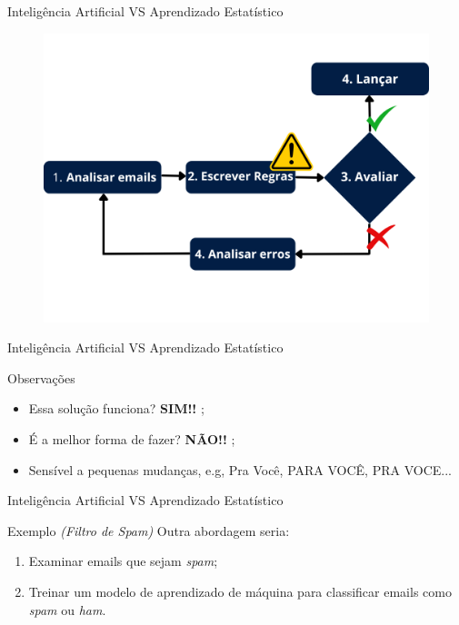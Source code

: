 \begin{frame}{Inteligência Artificial VS Aprendizado Estatístico}
	\begin{figure}[h]
		\includegraphics[scale=0.4]{imagens//secao1/tradicionalspam.png}
	\end{figure}
\end{frame}


\begin{frame}{Inteligência Artificial VS Aprendizado Estatístico}
	\begin{block}{Observações}
		\begin{itemize}
			\item Essa solução funciona? \textbf{SIM!!} ; 
			\item É a melhor forma de fazer? \textbf{NÃO!!} ;
			\item Sensível a pequenas mudanças, e.g, Pra Você, PARA VOCÊ, PRA VOCE...
		\end{itemize}
	\end{block}
\end{frame}

\begin{frame}{Inteligência Artificial VS Aprendizado Estatístico}
	\begin{block}{Exemplo \textit{(Filtro de Spam)}}
		\justifying
		Outra abordagem seria:
		\begin{enumerate}
			\justifying
			\item Examinar emails que sejam \textit{spam};
			\item Treinar um modelo de aprendizado de máquina para classificar emails como \textit{spam} ou \textit{ham}.
		\end{enumerate}
	\end{block}
\end{frame}

